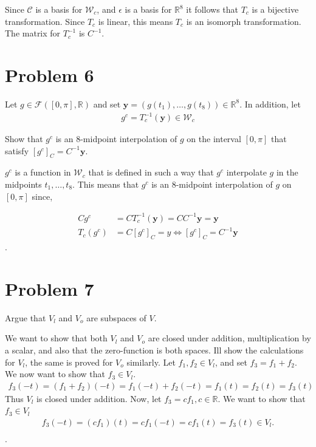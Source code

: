\documentclass[paper=a4, fontsize=11pt]{scrartcl} %
\numberwithin{equation}{section} %
\numberwithin{figure}{section} %
\numberwithin{table}{section} %
\theoremstyle{definition}
\begin{document}
Since $\mathcal{C}$ is a basis for $\mathcal{W}_c$, and $\epsilon$ is a basis for $\mathbb{R}^8$ it follows that $T_c$ is a bijective transformation. Since $T_c$ is linear, this 
means $T_c$ is an isomorph transformation. 
The matrix for $T_c^{-1}$ is $C^{-1}$. 
\section*{Problem 6}
Let $g \in \mathcal{F}\left( \left[ 0, \pi \right], \mathbb{R} \right)$ and set
$\mathbf{y} = \left(g(t_1), \dots, g(t_8)\right) \in \mathbb{R}^8$. In addition, let
\begin{align*}
  g^c = T_c^{-1}(\mathbf{y}) \in \mathcal{W}_c
\end{align*}

Show that $g^c$ is an 8-midpoint interpolation of $g$ on the interval $\left[ 0, \pi \right]$ that satisfy $\left[ g^c \right]_C = C^{-1}\mathbf{y}$.

$g^c$ is a function in $\mathcal{W}_c$ that is defined in such a way that $g^c$ interpolate $g$ in the midpoints $t_1, \dots, t_8$. This means that $g^c$ is an 8-midpoint interpolation of $g$ on $\left[ 0, \pi \right]$ since, 

\begin{align*}
  Cg^c &= CT_c^{-1}(\mathbf{y}) = CC^{-1}\mathbf{y} = \mathbf{y}\\
  T_c(g^c) &= C\left[ g^c \right]_C = y \Leftrightarrow \left[ g^c \right]_C = C^{-1}\mathbf{y}
\end{align*}.

\section*{Problem 7}

Argue that $V_l$ and $V_o$ are subspaces of $V$. 

We want to show that both $V_l$ and $V_o$ are closed under addition, multiplication by a
scalar, and also that the zero-function is both spaces. 
Ill show the calculations for $V_l$, the same is proved for $V_o$ similarly.
Let $f_1, f_2 \in V_l$, and set $f_3 = f_1 + f_2$.
We now want to show that $f_3 \in V_l$.
\begin{align*}
f_3(-t) = (f_1 + f_2)(-t) = f_1(-t) + f_2(-t) = f_1(t) = f_2(t) = f_3(t)
\end{align*}
Thus $V_l$ is closed under addition.
Now, let $f_3 = cf_1, c \in \mathbb{R}$.
We want to show that $f_3 \in V_l$
\begin{align*}
  f_3(-t) =(cf_1)(t) =  cf_1(-t) = cf_1(t) = f_3(t) \in V_l.\\
\end{align*}.
\end{document}
